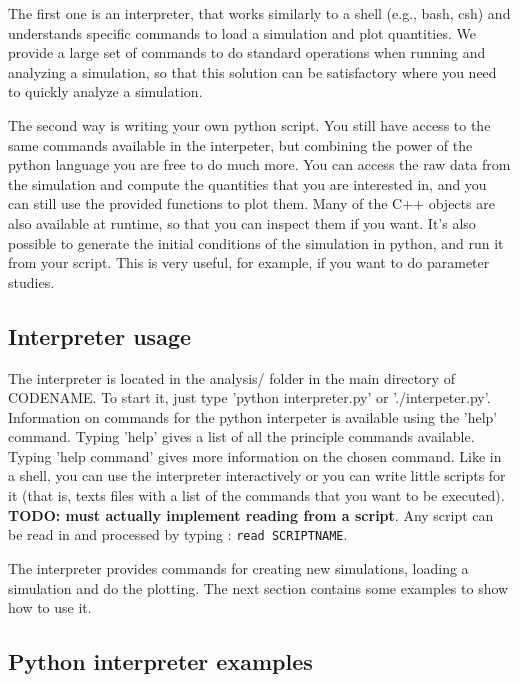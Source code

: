 \documentclass[a4paper]{article}
\newcommand{\var}[1]{\texttt{#1}}
\begin{document}
The first one is an interpreter, that works similarly to a shell (e.g., bash, csh) and understands specific commands to load a simulation and plot quantities. We provide a large set of commands to do standard operations when running and analyzing a simulation, so that this solution can be satisfactory where you need to quickly analyze a simulation.

The second way is writing your own python script. You still have access to the same commands available in the interpeter, but combining the power of the python language you are free to do much more. You can access the raw data from the simulation and compute the quantities that you are interested in, and you can still use the provided functions to plot them. Many of the C++ objects are also available at runtime, so that you can inspect them if you want. It's also possible to generate the initial conditions of the simulation in python, and run it from your script. This is very useful, for example, if you want to do parameter studies.


\subsection{Interpreter usage}

The interpreter is located in the analysis/ folder in the main directory of CODENAME. To start it, just type 'python interpreter.py' or './interpeter.py'.
Information on commands for the python interpeter is available using the 'help' command.  Typing 'help' gives a list of all the principle commands available.  Typing 'help command' gives more information on the chosen command.
Like in a shell, you can use the interpreter interactively or you can write little scripts for it (that is, texts files with a list of the commands that you want to be executed). \textbf{TODO: must actually implement reading from a script}. Any script can be read in and processed by typing : \var{read SCRIPTNAME}.

The interpreter provides commands for creating new simulations, loading a simulation and do the plotting. The next section contains some examples to show how to use it.



\subsection{Python interpreter examples}
\end{document}
